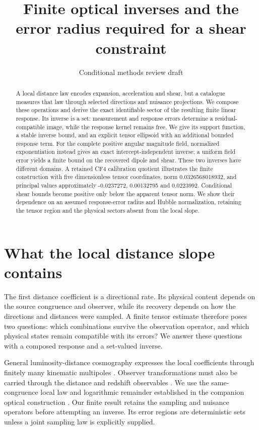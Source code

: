 \documentclass[aps,prd,reprint,onecolumn,11pt,nofootinbib,notitlepage]{revtex4-2}
\begin{document}
\title{Finite optical inverses and the error radius required for a shear constraint}
\author{Conditional methods review draft}\noaffiliation
\begin{abstract}


A local distance law encodes expansion, acceleration and shear, but a catalogue measures that law through selected directions and nuisance projections. We compose these operations and derive the exact identifiable sector of the resulting finite linear response. Its inverse is a set: measurement and response errors determine a residual-compatible image, while the response kernel remains free. We give its support function, a stable inverse bound, and an explicit tensor ellipsoid with an additional bounded response term. For the complete positive angular magnitude field, normalized exponentiation instead gives an exact intercept-independent inverse; a uniform field error yields a finite bound on the recovered dipole and shear. These two inverses have different domains. A retained CF4 calibration quotient illustrates the finite construction with five dimensionless tensor coordinates, norm 0.0326568018932, and principal values approximately -0.0237272, 0.00132795 and 0.0223992. Conditional shear bounds become positive only below the apparent tensor norm. We show their dependence on an assumed response-error radius and Hubble normalization, retaining the tensor region and the physical sectors absent from the local slope.


\end{abstract}
\maketitle
\section{What the local distance slope contains}

The first distance coefficient is a directional rate. Its physical content depends on the source congruence and observer, while its recovery depends on how the directions and distances were sampled. A finite tensor estimate therefore poses two questions: which combinations survive the observation operator, and which physical states remain compatible with its errors? We answer these questions with a composed response and a set-valued inverse.

General luminosity-distance cosmography expresses the local coefficients through finitely many kinematic multipoles \cite{Heinesen2021}. Observer transformations must also be carried through the distance and redshift observables \cite{Maartens2024}. We use the same-congruence local law and logarithmic remainder established in the companion optical construction \cite{QOMethods}. Our finite result retains the sampling and nuisance operators before attempting an inverse. Its error regions are deterministic sets unless a joint sampling law is explicitly supplied.
\end{document}
